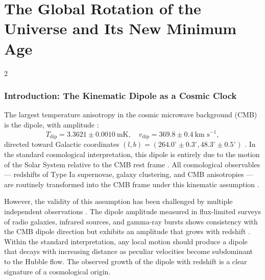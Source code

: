 \documentclass[12pt,a4paper]{article}
\begin{document}
	\part{The Global Rotation of the Universe and Its New Minimum Age}
	\label{part:IV}
	
	\begin{multicols}{2}
		
		\section{Introduction: The Kinematic Dipole as a Cosmic Clock}
		
		The largest temperature anisotropy in the cosmic microwave background (CMB) is the dipole, with amplitude \cite{Planck2018VI, Planck2018VII}:
		\begin{equation}
			T_{\text{dip}} = 3.3621 \pm 0.0010\ \text{mK}, \quad v_{\text{dip}} = 369.8 \pm 0.4\ \text{km s}^{-1},
		\end{equation}
		directed toward Galactic coordinates \((l,b) = (264.0^\circ \pm 0.3^\circ, 48.3^\circ \pm 0.5^\circ)\) \cite{Planck2018I}. In the standard cosmological interpretation, this dipole is entirely due to the motion of the Solar System relative to the CMB rest frame \cite{PlanckIntLVI}. All cosmological observables — redshifts of Type Ia supernovae, galaxy clustering, and CMB anisotropies — are routinely transformed into the CMB frame under this kinematic assumption \cite{Planck2018V,Planck2018VI}.
		
		However, the validity of this assumption has been challenged by multiple independent observations \cite{Gibelyou2012, Yoon2014}. The dipole amplitude measured in flux-limited surveys of radio galaxies, infrared sources, and gamma-ray bursts shows consistency with the CMB dipole direction but exhibits an amplitude that grows with redshift \cite{Bengaly2017, Siewert2021, Colin2017, Secrest2025}. Within the standard interpretation, any local motion should produce a dipole that decays with increasing distance as peculiar velocities become subdominant to the Hubble flow. The observed growth of the dipole with redshift is a clear signature of a cosmological origin.
		

\end{multicols}
\end{document}
